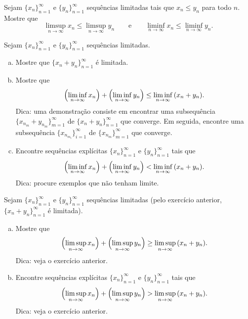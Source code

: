 \begin{exercise}
Sejam $\{ x_n \}_{n=1}^\infty$ e $\{ y_n \}_{n=1}^\infty$ sequências limitadas tais que
$x_n \leq y_n$ para todo $n$. Mostre que
\begin{equation*}
\limsup_{n\to\infty} x_n \leq
\limsup_{n\to\infty} y_n
\qquad \text{e} \qquad
\liminf_{n\to\infty} x_n \leq
\liminf_{n\to\infty} y_n .
\end{equation*}
\end{exercise}

\begin{exercise}
Sejam $\{ x_n \}_{n=1}^\infty$ e $\{ y_n \}_{n=1}^\infty$ sequências limitadas.
\begin{enumerate}[a)]
\item
Mostre que $\{ x_n + y_n \}_{n=1}^\infty$ é limitada.
\item
Mostre que
\begin{equation*}
\Bigl(\liminf_{n\to \infty} x_n\Bigr)
+
\Bigl(\liminf_{n\to \infty} y_n\Bigr)
\leq
\liminf_{n\to \infty} \, (x_n+y_n) .
\end{equation*}
Dica: uma demonstração consiste em encontrar uma subsequência $\{ x_{n_m}+y_{n_m} \}_{m=1}^\infty$ de
$\{ x_n + y_n \}_{n=1}^\infty$ que converge.
Em seguida, encontre uma subsequência $\{ x_{n_{m_i}} \}_{i=1}^\infty$ de
$\{ x_{n_m} \}_{m=1}^\infty$ que converge.
\item
Encontre sequências explícitas $\{ x_n \}_{n=1}^\infty$ e $\{ y_n \}_{n=1}^\infty$ tais que
\begin{equation*}
\Bigl(\liminf_{n\to \infty} x_n\Bigr)
+
\Bigl(\liminf_{n\to \infty} y_n\Bigr)
<
\liminf_{n\to \infty} \, (x_n+y_n) .
\end{equation*}
Dica: procure exemplos que não tenham limite.
\end{enumerate}
\end{exercise}

\begin{samepage}
\begin{exercise}
Sejam $\{ x_n \}_{n=1}^\infty$ e $\{ y_n \}_{n=1}^\infty$ sequências limitadas (pelo exercício anterior,
$\{ x_n + y_n \}_{n=1}^\infty$ é limitada).
\begin{enumerate}[a)]
\item
Mostre que
\begin{equation*}
\Bigl(\limsup_{n\to \infty} x_n\Bigr)
+
\Bigl(\limsup_{n\to \infty} y_n\Bigr)
\geq
\limsup_{n\to \infty} \, (x_n+y_n) .
\end{equation*}
Dica: veja o exercício anterior.
\item
Encontre sequências explícitas $\{ x_n \}_{n=1}^\infty$ e $\{ y_n \}_{n=1}^\infty$ tais que
\begin{equation*}
\Bigl(\limsup_{n\to \infty} x_n\Bigr)
+
\Bigl(\limsup_{n\to \infty} y_n\Bigr)
>
\limsup_{n\to \infty} \, (x_n+y_n) .
\end{equation*}
Dica: veja o exercício anterior.
\end{enumerate}
\end{exercise}
\end{samepage}


